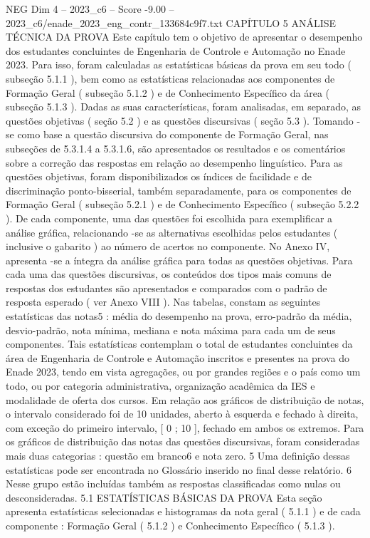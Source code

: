 \begin{textsample}{NEG Dim 4 – 2023\_c6 – Score -9.00 – 2023\_c6/enade\_2023\_eng\_contr\_133684c9f7.txt}  \label{ex:f4_neg_008}
CAPÍTULO 5 ANÁLISE TÉCNICA DA PROVA Este capítulo tem o objetivo de apresentar o desempenho dos estudantes concluintes de Engenharia de Controle e Automação no Enade 2023.
Para isso, foram calculadas as estatísticas básicas da prova em seu todo ( subseção 5.1.1 ), bem como as estatísticas relacionadas aos componentes de Formação Geral ( subseção 5.1.2 ) e de Conhecimento Específico da área ( subseção 5.1.3 ).
Dadas as suas características, foram analisadas, em separado, as questões objetivas ( seção 5.2 ) e as questões discursivas ( seção 5.3 ).
Tomando -se como base a questão discursiva do componente de Formação Geral, nas subseções de 5.3.1.4 a 5.3.1.6, são apresentados os resultados e os comentários sobre a correção das respostas em relação ao desempenho linguístico.
Para as questões objetivas, foram disponibilizados os índices de facilidade e de discriminação ponto-bisserial, também separadamente, para os componentes de Formação Geral ( subseção 5.2.1 ) e de Conhecimento Específico ( subseção 5.2.2 ).
De cada componente, uma das questões foi escolhida para exemplificar a análise gráfica, relacionando -se as alternativas escolhidas pelos estudantes ( inclusive o gabarito ) ao número de acertos no componente.
No Anexo IV, apresenta -se a íntegra da análise gráfica para todas as questões objetivas.
Para cada uma das questões discursivas, os conteúdos dos tipos mais comuns de respostas dos estudantes são apresentados e comparados com o padrão de resposta esperado ( ver Anexo VIII ).
Nas tabelas, constam as seguintes estatísticas das notas5 : média do desempenho na prova, erro-padrão da média, desvio-padrão, nota mínima, mediana e nota máxima para cada um de seus componentes.
Tais estatísticas contemplam o total de estudantes concluintes da área de Engenharia de Controle e Automação inscritos e presentes na prova do Enade 2023, tendo em vista agregações, ou por grandes regiões e o país como um todo, ou por categoria administrativa, organização acadêmica da IES e modalidade de oferta dos cursos.
Em relação aos gráficos de distribuição de notas, o intervalo considerado foi de 10 unidades, aberto à esquerda e fechado à direita, com exceção do primeiro intervalo, [ 0 ; 10 ], fechado em ambos os extremos.
Para os gráficos de distribuição das notas das questões discursivas, foram consideradas mais duas categorias : questão em branco6 e nota zero. 5 Uma definição dessas estatísticas pode ser encontrada no Glossário inserido no final desse relatório. 6 Nesse grupo estão incluídas também as respostas classificadas como nulas ou desconsideradas. 5.1 ESTATÍSTICAS BÁSICAS DA PROVA Esta seção apresenta estatísticas selecionadas e histogramas da nota geral ( 5.1.1 ) e de cada componente : Formação Geral ( 5.1.2 ) e Conhecimento Específico ( 5.1.3 ).

\end{textsample}
